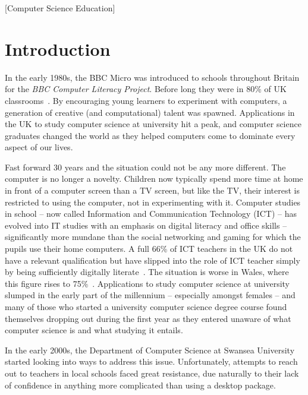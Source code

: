 \documentclass{sig-alternate}
\begin{document}
[Computer Science Education]


\section{Introduction}
In the early 1980s, the BBC Micro was introduced to schools throughout
Britain for the \emph{BBC Computer Literacy Project}.
Before long they were in 80\% of UK classrooms~\cite{vasko:1986}.
By encouraging young learners to experiment with computers, a generation
of creative (and computational) talent was spawned. Applications in
the UK to study computer science at university hit a peak, and
computer science graduates changed the world as they helped computers
come to dominate every aspect of our lives.

Fast forward 30 years and the situation could not be any more
different. The computer is no longer a novelty. Children now typically
spend more time at home in front of a computer screen than a TV screen, but
like the TV, their interest is restricted to using the computer, not
in experimenting with it. Computer studies in school -- now called
Information and Communication Technology (ICT) -- has evolved into IT
studies with an emphasis on digital literacy and office skills --
significantly more mundane than the social networking and gaming for
which the pupils use their home computers. A full 66\% of ICT teachers
in the UK do not have a relevant qualification but have slipped into
the role of ICT teacher simply by being sufficiently digitally
literate~\cite{RoyalSoc:2012}.
The situation is worse in Wales, where this figure rises to
75\%~\cite{GTCW:2008}.
Applications to
study computer science at university slumped in the early part of the
millennium -- especially amongst females -- and
many of those who started a university computer science degree course
found themselves dropping out during the first year as they entered
unaware of what computer science is and what studying it entails.

In the early 2000s, the Department of Computer Science at Swansea University
started looking into ways to address this issue.
Unfortunately, attempts to reach out to teachers in local schools
faced great resistance, due naturally to their lack of confidence
in anything more complicated than using a desktop package.
\end{document}
